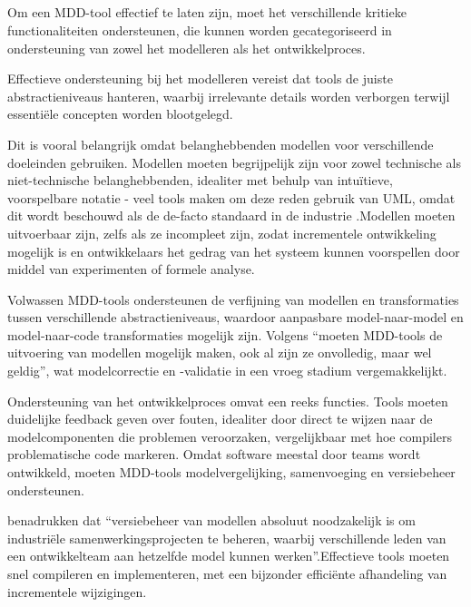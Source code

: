 \subsection{}%
Om een MDD-tool effectief te laten zijn, moet het verschillende kritieke functionaliteiten ondersteunen, die kunnen worden gecategoriseerd in ondersteuning van zowel het modelleren als het ontwikkelproces.

Effectieve ondersteuning bij het modelleren vereist dat tools de juiste abstractieniveaus hanteren, waarbij irrelevante details worden verborgen terwijl essentiële concepten worden blootgelegd. 

Dit is vooral belangrijk omdat belanghebbenden modellen voor verschillende doeleinden gebruiken. Modellen moeten begrijpelijk zijn voor zowel technische als niet-technische belanghebbenden, idealiter met behulp van intuïtieve, voorspelbare notatie - veel tools maken om deze reden gebruik van UML, omdat dit wordt beschouwd als de de-facto standaard in de industrie \autocite{Marin2015} .Modellen moeten uitvoerbaar zijn, zelfs als ze incompleet zijn, zodat incrementele ontwikkeling mogelijk is en ontwikkelaars het gedrag van het systeem kunnen voorspellen door middel van experimenten of formele analyse. 

Volwassen MDD-tools ondersteunen de verfijning van modellen en transformaties tussen verschillende abstractieniveaus, waardoor aanpasbare model-naar-model en model-naar-code transformaties mogelijk zijn. Volgens \textcite{Marin2015} “moeten MDD-tools de uitvoering van modellen mogelijk maken, ook al zijn ze onvolledig, maar wel geldig”, wat modelcorrectie en -validatie in een vroeg stadium vergemakkelijkt.

Ondersteuning van het ontwikkelproces omvat een reeks functies. Tools moeten duidelijke feedback geven over fouten, idealiter door direct te wijzen naar de modelcomponenten die problemen veroorzaken, vergelijkbaar met hoe compilers problematische code markeren. 
Omdat software meestal door teams wordt ontwikkeld, moeten MDD-tools modelvergelijking, samenvoeging en versiebeheer ondersteunen. 

\textcite{Marin2015} benadrukken dat “versiebeheer van modellen absoluut noodzakelijk is om industriële samenwerkingsprojecten te beheren, waarbij verschillende leden van een ontwikkelteam aan hetzelfde model kunnen werken”.Effectieve tools moeten snel compileren en implementeren, met een bijzonder efficiënte afhandeling van incrementele wijzigingen.


